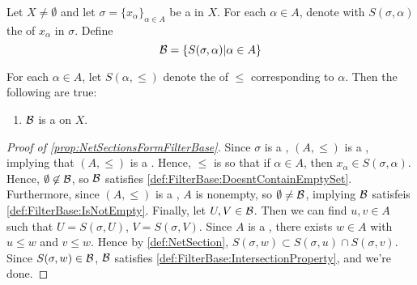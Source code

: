 \begin{prop}
    \label{prop:NetSectionsFormFilterBaseBase}
    \rm
    Let $X \neq \emptyset$
    and let $\sigma=\{x_\alpha\}_{\alpha \in A}$
    be a \Net in $X$. 
    For each 
    $\alpha \in A$, denote  with
    $S(\sigma, \alpha ) $ 
    the \NetSection of $x_\alpha$ in $\sigma$. 
    Define 
    \begin{equation*}
        \mathcal{B}=\{S(\sigma, \alpha ) | \alpha \in A\}
    \end{equation*}

    For each $\alpha \in A$, let $S(\alpha,  \leq)$ 
    denote the \DirectedSection of $\leq$ corresponding to 
    $\alpha$.
    Then the following are true:
    \begin{enumerate}[label=(\roman*), ref={\ref{prop:NetSectionsFormFilterBaseBase}~\roman*}]
        \item 
        \label{prop:NetSectionsFormFilterBase}
        $\mathcal{B}$ is a \FilterBase on $X$. 
    \end{enumerate}
    \begin{proof}[Proof of \ref{prop:NetSectionsFormFilterBase}]
        Since $\sigma$ is a \Net, 
        $(A,\leq)$ is a \DirectedSet, 
        implying that $(A,\leq)$ is a \PreorderedSet.
        Hence, $\leq$ is \ReflexiveRelation so that
        if $\alpha \in A$, then $x_\alpha \in S(\sigma, \alpha)$. 
        Hence, $\emptyset \not \in \mathcal{B}$, so 
        $\mathcal{B}$ satisfies 
        \ref{def:FilterBase:DoesntContainEmptySet}.
        Furthermore, since 
        $(A,\leq)$ is a \PreorderedSet, 
        $A$ is nonempty, so 
        $\emptyset \neq \mathcal{B}$, implying $\mathcal{B}$ satisfeis 
        \ref{def:FilterBase:IsNotEmpty}. 
        Finally, let $U,V \in \mathcal{B}$. 
        Then we can find $u,v \in A$ such that 
        $U = S(\sigma, U)$, $V=S(\sigma, V)$. 
        Since $A$ is a \DirectedSet, 
        there exists $w \in A$ with $u \leq w$ and $v \leq w$. 
        Hence by \ref{def:NetSection}, 
        $S(\sigma, w ) \subset S(\sigma, u) \cap S(\sigma, v)$. 
        Since $S(\sigma, w ) \in \mathcal{B}$, 
        $\mathcal{B}$ satisfies 
        \ref{def:FilterBase:IntersectionProperty}, 
        and we're done. 
    \end{proof}
\end{prop}
